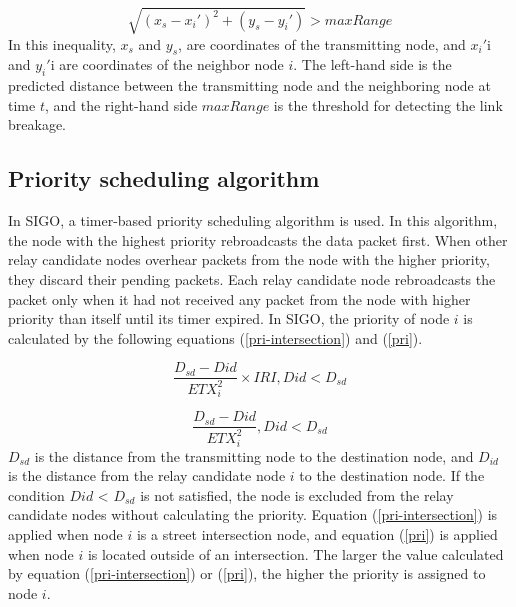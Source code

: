 \documentclass[conference]{IEEEtran}
\begin{document}
\begin{equation}
\label{expired_links}
\sqrt{\left(x_s - x_i'\right)^2 + \left(y_s - y_i'\right)} > maxRange
\end{equation}
In this inequality, $x_s$ and  $y_s$, are coordinates of the  transmitting node, and $x_i'$i and $y_i'$i are coordinates of the neighbor node $i$.
The left-hand side is the predicted distance between the transmitting node and the neighboring node at time $t$, and the right-hand side $maxRange$ is the threshold for detecting the link breakage.


\subsection{Priority scheduling algorithm}
\label{priority}
In SIGO, a timer-based priority scheduling algorithm is used. 
In this algorithm, the node with the highest priority rebroadcasts the data packet first. When other relay candidate nodes overhear packets from the node with the higher priority, they discard their pending packets. Each relay candidate node rebroadcasts the packet only when it had not received any packet from the node with higher priority than itself until its timer expired.
In SIGO, the priority of node $i$ is calculated by the following equations (\ref{pri-intersection}) and (\ref{pri}).


\begin{equation}
\label{pri-intersection}
\frac{D_{sd} - D{id}}{ETX_{i}^{2}} \times IRI,  D{id} < D_{sd}
\end{equation}

\begin{equation}
\label{pri}
\frac{D_{sd} - D{id}}{ETX_{i}^{2}} ,   D{id} < D_{sd}
\end{equation}
$D_{sd}$ is the distance from the transmitting node to the destination node, and $D_{id}$ is the distance from the relay candidate node $i$ to the destination node. If the condition $D{id}$ < $D_{sd}$ is not satisfied, the node is excluded from the relay candidate nodes without calculating the priority. 
Equation (\ref{pri-intersection}) is applied when node $i$ is a street intersection node, and equation (\ref{pri}) is applied when node $i$ is located outside of an intersection. 
The larger the value calculated by equation (\ref{pri-intersection}) or (\ref{pri}), the higher the priority is assigned to node $i$. 
\end{document}
